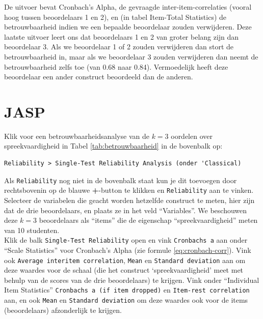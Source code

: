 \documentclass[
]{book}
\begin{document}
De uitvoer bevat Cronbach's Alpha, de gevraagde
inter-item-correlaties (vooral hoog tussen beoordelaars 1 en 2), en (in
tabel Item-Total Statistics) de betrouwbaarheid indien we een bepaalde
beoordelaar zouden verwijderen. Deze laatste uitvoer leert ons dat
beoordelaars 1 en 2 van groter belang zijn dan beoordelaar 3. Als we
beoordelaar 1 of 2 zouden verwijderen dan stort de betrouwbaarheid in,
maar als we beoordelaar 3 zouden verwijderen dan neemt de
betrouwbaarheid zelfs toe (van 0.68 naar 0.84). Vermoedelijk heeft deze
beoordelaar een ander construct beoordeeld dan de anderen.

\hypertarget{jasp-11}{%
\section{JASP}\label{jasp-11}}

Klik voor een betrouwbaarheidsanalyse van de \(k=3\) oordelen over spreekvaardigheid in Tabel \ref{tab:betrouwbaarheid} in de bovenbalk op:\\

\begin{verbatim}
Reliability > Single-Test Reliability Analysis (onder 'Classical)
\end{verbatim}

Als \texttt{Reliability} nog niet in de bovenbalk staat kun je dit toevoegen door rechtsbovenin op de blauwe \textbf{+}-button te klikken en \texttt{Reliability} aan te vinken.\\
Selecteer de variabelen die geacht worden hetzelfde construct te meten, hier zijn dat de drie beoordelaars, en plaats ze in het veld ``Variables''. We beschouwen deze \(k=3\) beoordelaars als ``items'' die de eigenschap ``spreekvaardigheid'' meten van 10 studenten.\\
Klik de balk \texttt{Single-Test\ Reliability} open en vink \texttt{Cronbach\textquotesingle{}s\ a} aan onder ``Scale Statistics'' voor Cronbach's Alpha (zie formule \eqref{eq:cronbach-corr}). Vink ook \texttt{Average\ interitem\ correlation}, \texttt{Mean} en \texttt{Standard\ deviation} aan om deze waardes voor de schaal (die het construct `spreekvaardigheid' meet met behulp van de scores van de drie beoordelaars) te krijgen. Vink onder ``Individual Item Statistics'' \texttt{Cronbach\textquotesingle{}s\ a\ (if\ item\ dropped)} en \texttt{Item-rest\ correlation} aan, en ook \texttt{Mean} en \texttt{Standard\ deviation} om deze waardes ook voor de items (beoordelaars) afzonderlijk te krijgen.\\
\end{document}
